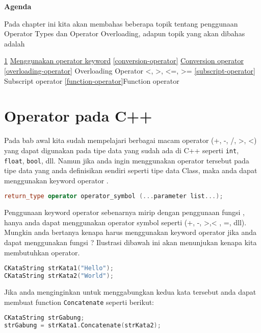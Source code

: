 \textbf{Agenda}

Pada chapter ini kita akan membahas beberapa topik tentang penggunaan
Operator Types dan Operator Overloading, adapun topik yang akan dibahas
adalah

\begin{outline}
\1
 \ref{operator-pada-cpp} \protect\hyperlink{operator-pada-cpp}{Menggunakan operator keyword}
\1
  \ref{conversion-operator} \protect\hyperlink{conversion-operator}{Conversion operator}
   \1
   \ref{overloading-operator} Overloading Operator \textless{}, \textgreater{}, \textless{}=, \textgreater{}=
\1
 \ref{subscript-operator} Subscript operator
\1
  \ref{function-operator}Function operator
\end{outline}

\section{Operator pada C++}\label{operator-pada-cpp}

Pada bab awal kita sudah mempelajari berbagai macam operator (+, -, /,
\textgreater{}, \textless{}) yang dapat digunakan pada tipe data yang
sudah ada di C++ seperti \texttt{int}, \texttt{float}, \texttt{bool},
dll. Namun jika anda ingin menggunakan operator tersebut pada tipe data
yang anda definisikan sendiri seperti tipe data Class, maka anda dapat
menggunakan keyword operator .

\begin{lstlisting}[language=c++, numbers=none]
return_type operator operator_symbol (...parameter list...);
\end{lstlisting}

Penggunaan keyword operator sebenarnya mirip dengan penggunaan fungsi ,
hanya anda dapat menggunakan operator symbol seperti (+, -,
\textgreater{},\textless{} , =, dll). Mungkin anda bertanya kenapa harus
menggunakan keyword operator jika anda dapat menggunakan fungsi ?
Ilustrasi dibawah ini akan menunjukan kenapa kita membutuhkan operator.

\begin{lstlisting}[language=c++, numbers=none]
CKataString strKata1("Hello");
CKataString strKata2("World");
\end{lstlisting}

Jika anda menginginkan untuk menggabungkan kedua kata tersebut anda
dapat membuat function \texttt{Concatenate} seperti berikut:

\begin{lstlisting}[language=c++, numbers=none]
CKataString strGabung;
strGabung = strKata1.Concatenate(strKata2);
\end{lstlisting}

